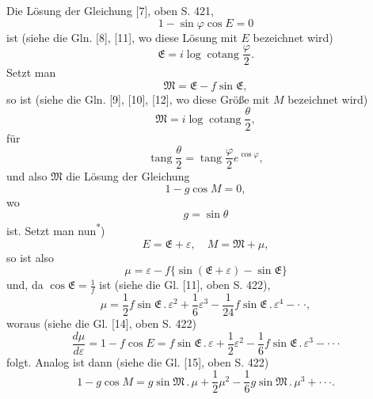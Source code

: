 \indent Die Lösung der Gleichung [7], oben S. 421,
\begin{equation}\tag*{[7]$'$}1-\sin\varphi\cos E=0\end{equation}
\noindent ist (siehe die Gln. [8], [11], wo diese Lösung mit \(E\) bezeichnet wird)
\[\mathfrak E=i\log\operatorname{cotang}\frac\varphi2.\]
\noindent Setzt man
\[\mathfrak M=\mathfrak E-f\sin\mathfrak E,\]
\noindent so ist (siehe die Gln. [9], [10], [12], wo diese Größe mit \(M\) bezeichnet wird)
\[\mathfrak M=i\log\operatorname{cotang}\frac\theta2,\]
\noindent für
\[\operatorname{tang}\frac\theta2=\operatorname{tang}\frac\varphi2 e^{\cos\varphi},\]
\noindent und also \(\mathfrak M\) die Lösung der Gleichung
\[1-g\cos M=0,\]
\noindent wo
\[g=\sin\theta\]
\noindent ist. Setzt man nun\textsuperscript{*})
\begin{equation}\tag*{($\ast$)}E=\mathfrak E+\varepsilon,\quad M=\mathfrak M+\mu,\end{equation}
\noindent so ist also
\[\mu=\varepsilon-f\{\sin(\mathfrak E+\varepsilon)-\sin\mathfrak E\}\]
\noindent und, da \(\cos\mathfrak E=\frac1f\) ist (siehe die Gl. [11], oben S. 422),
\begin{equation}\tag*{[13]$'$}
\mu=\frac12 f\sin\mathfrak E\,{.}\,\varepsilon^2+\frac16\varepsilon^3-\frac1{24}f\sin\mathfrak E\,{.}\,\varepsilon^4-\cdotp\;\cdotp,
\end{equation}
\noindent woraus (siehe die Gl. [14], oben S. 422)
\begin{equation}\tag*{[14]$'$}
\frac{d\mu}{d\varepsilon}=1-f\cos E=f\sin\mathfrak E\,{.}\,\varepsilon+\frac12\varepsilon^2-\frac16 f\sin\mathfrak E\,{.}\,\varepsilon^3-\cdotp\cdotp\cdotp
\end{equation}
\noindent folgt. Analog ist dann (siehe die Gl. [15], oben S. 422)
\begin{equation}\tag*{[15]$'$}
1-g\cos M=g\sin\mathfrak M\,{.}\,\mu+\frac12\mu^2-\frac16g\sin\mathfrak M\,{.}\,\mu^3+\cdotp\cdotp\cdotp.
\end{equation}

